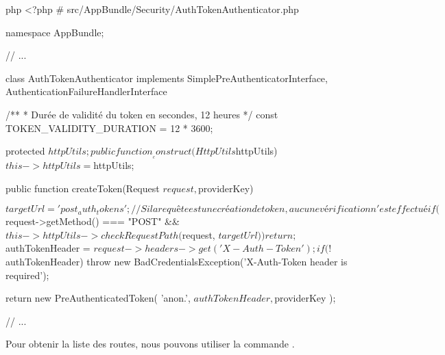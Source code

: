 \documentclass[big]{zmdocument}
\begin{document}
\begin{CodeBlock}{php}
<?php
# src/AppBundle/Security/AuthTokenAuthenticator.php

namespace AppBundle\Security;

// ...

class AuthTokenAuthenticator implements SimplePreAuthenticatorInterface, AuthenticationFailureHandlerInterface
{
    /**
    * Durée de validité du token en secondes, 12 heures
    */
    const TOKEN_VALIDITY_DURATION = 12 * 3600;

    protected $httpUtils;

    public function __construct(HttpUtils $httpUtils)
    {
        $this->httpUtils = $httpUtils;
    }

    public function createToken(Request $request, $providerKey)
    {
        $targetUrl = 'post_auth_tokens';
        // Si la requête est une création de token, aucune vérification n'est effectué
        if ($request->getMethod() === "POST" && $this->httpUtils->checkRequestPath($request, $targetUrl)) {
            return;
        }
      
        $authTokenHeader = $request->headers->get('X-Auth-Token');

        if (!$authTokenHeader) {
            throw new BadCredentialsException('X-Auth-Token header is required');
        }

        return new PreAuthenticatedToken(
            'anon.',
            $authTokenHeader,
            $providerKey
        );
    }
    // ...
}
\end{CodeBlock}



Pour obtenir la liste des routes, nous pouvons utiliser la commande .
\end{document}
